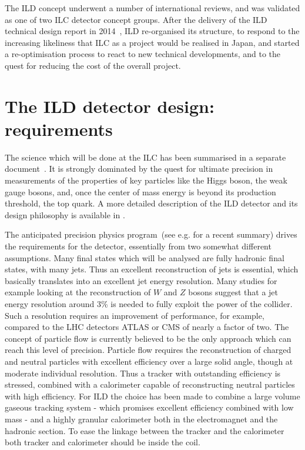 \documentclass[%
 amsmath,amssymb,
 aps,
]{revtex4-1}
\begin{document}
The ILD concept underwent a number of international reviews, and was validated as one of two ILC detector concept groups. After the delivery of the ILD technical design report in 2014~\cite{Behnke:2013lya}, ILD re-organised its structure, to respond to the increasing likeliness that ILC as a project would be realised in Japan, and started a re-optimisation process to react to new technical developments, and to the quest for reducing the cost of the overall project. 

\section{The ILD detector design: requirements}
The science which will be done at the ILC has been summarised in a separate document~\cite{ILCESU1}. It is strongly dominated by the quest for ultimate precision in measurements of the properties of key particles like the Higgs boson, the weak gauge bosons, and, once the center of mass energy is beyond its production threshold, the top quark. A more detailed description of the ILD detector and its design philosophy is available in \cite{Behnke:2013lya}.

The anticipated precision physics program~(see e.g. \cite{Fujii:2017vwa} for a recent summary) drives the requirements for the detector, essentially from two somewhat different assumptions. Many final states which will be analysed are fully hadronic final states, with many jets. Thus an excellent reconstruction of jets is essential, which basically translates into an excellent jet energy resolution. Many studies for example looking at the reconstruction of $W$ and $Z$ bosons suggest that a jet energy resolution around 3\% is needed to fully exploit the power of the collider. Such a resolution requires an improvement of performance, for example, compared to the LHC detectors ATLAS or CMS of nearly a factor of two. The concept of particle flow is currently believed to be the only approach which can reach this level of precision. Particle flow requires the reconstruction of charged and neutral particles with excellent efficiency over a large solid angle, though at moderate individual resolution. Thus a tracker with outstanding efficiency is stressed, combined with a calorimeter capable of reconstructing neutral particles with high efficiency. For ILD the choice has been made to combine a large volume gaseous tracking system - which promises excellent efficiency combined with low mass - and a highly granular calorimeter both in the electromagnet and the hadronic section. To ease the linkage between the tracker and the calorimeter both tracker and calorimeter should be inside the coil. 
\end{document}
